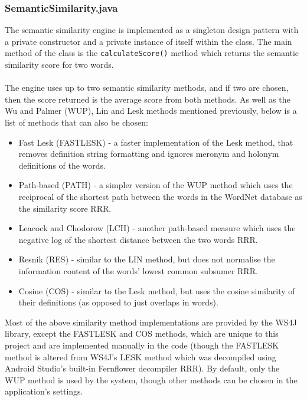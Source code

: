 \documentclass[11pt]{article}
\begin{document}
\subsubsection{SemanticSimilarity.java}
\label{section:semantic-impl}

The semantic similarity engine is implemented as a singleton design pattern with a private constructor and a private instance of itself within the class. The main method of the class is the \texttt{calculateScore()} method which returns the semantic similarity score for two words.
\\
\\
The engine uses up to two semantic similarity methods, and if two are chosen, then the score returned is the average score from both methods. As well as the Wu and Palmer (WUP), Lin and Lesk methods mentioned previously, below is a list of methods that can also be chosen: 

\begin{itemize}
\item Fast Lesk (FASTLESK) - a faster implementation of the Lesk method, that removes definition string formatting and ignores meronym and holonym definitions of the words.

\item Path-based (PATH) - a simpler version of the WUP method which uses the reciprocal of the shortest path between the words in the WordNet database as the similarity score RRR.

\item Leacock and Chodorow (LCH) - another path-based measure which uses the negative log of the shortest distance between the two words RRR.

\item Resnik (RES) - similar to the LIN method, but does not normalise the information content of the words' lowest common subsumer RRR.

\item Cosine (COS) - similar to the Lesk method, but uses the cosine similarity of their definitions (as opposed to just overlaps in words).
\end{itemize}

Most of the above similarity method implementations are provided by the WS4J library, except the FASTLESK and COS methods, which are unique to this project and are implemented manually in the code (though the FASTLESK method is altered from WS4J's LESK method which was decompiled using Android Studio's built-in Fernflower decompiler RRR). By default, only the WUP method is used by the system, though other methods can be chosen in the application's settings.
\end{document}
